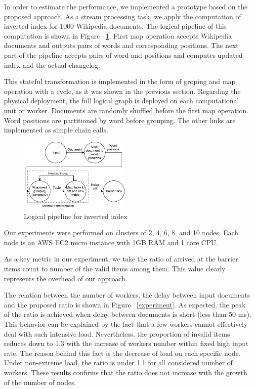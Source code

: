 
\label {fs-experiments}

In order to estimate the performance, we implemented a prototype based on the proposed approach. As a stream processing task, we apply the computation of inverted index for 1000 Wikipedia documents. The logical pipeline of this computation is shown in Figure ~\ref{inverted-index}. First map operation accepts Wikipedia documents and outputs pairs of words and corresponding positions. The next part of the pipeline accepts pairs of word and positions and computes updated index and the actual changelog. 

This stateful transformation is implemented in the form of groping and map operation with a cycle, as it was shown in the previous section. Regarding the physical deployment, the full logical graph is deployed on each computational unit or worker. Documents are randomly shuffled before the first map operation. Word positions are partitioned by word before grouping. The other links are implemented as simple chain calls.

\begin{figure}[htbp]
  \centering
  \includegraphics[width=0.48\textwidth]{pics/inverted-index}
  \caption{Logical pipeline for inverted index}
  \label {inverted-index}
\end{figure}

Our experiments were performed on clusters of 2, 4, 6, 8, and 10 nodes. Each node is an AWS EC2 micro instance with 1GB RAM and 1 core CPU.

As a key metric in our experiment, we take the ratio of arrived at the barrier items count to number of the valid items among them. This value clearly represents the overhead of our approach. 

The relation between the number of workers, the delay between input documents and the proposed ratio is shown in Figure ~\ref{experiment}. As expected, the peak of the ratio is achieved when delay between documents is short (less than 50 ms). This behavior can be explained by the fact that a few workers cannot effectively deal with such intensive load. Nevertheless, the proportion of invalid items reduces down to 1.3 with the increase of workers number within fixed high input rate. The reason behind this fact is the decrease of load on each specific node. Under non-extreme load, the ratio is under 1.1 for all considered number of workers. These results confirms that the ratio does not increase with the growth of the number of nodes.

